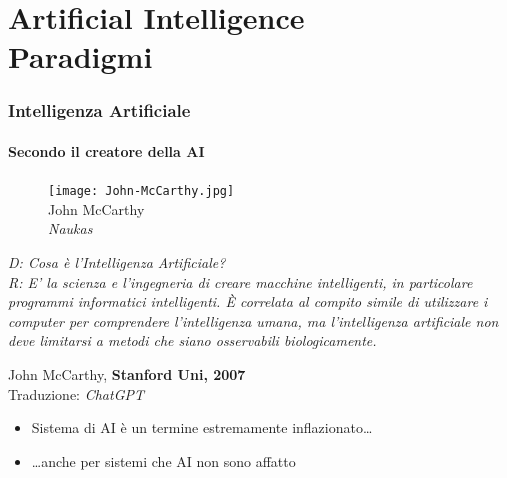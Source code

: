 \section{Artificial Intelligence\\{\small Paradigmi}} %
\label{sec:ai_paradigms}
%
\begin{frame}[t,fragile] \frametitle{Intelligenza Artificiale}
{\scriptsize
	\onslide<1->
		\framesubtitle{Secondo il creatore della AI}
		\vspace*{3pt}
		\begin{minipage}[t]{\textwidth}
			\begin{minipage}[t]{0.45\textwidth}
				\centering
				\begin{figure}[ht]
					\texttt{[image: John-McCarthy.jpg]}
					{\tiny\\John McCarthy\\\vspace*{-1pt}\textit{\textcopyright Naukas}}
				\end{figure}
			\end{minipage}
		    \begin{minipage}[t]{0.5\textwidth}
				\renewcommand{\epigraphsize}{\small}
				\setlength{\afterepigraphskip}{0pt}
				\setlength{\beforeepigraphskip}{5pt}
				\setlength{\epigraphwidth}{\textwidth}
				\epigraph{
					\textit{\alert{D:} Cosa è l'Intelligenza Artificiale?\\
					\alert{R:} E' la scienza e l'ingegneria di creare macchine intelligenti, in particolare programmi informatici intelligenti. È correlata al compito simile di utilizzare i computer per comprendere l'intelligenza umana, ma l'intelligenza artificiale non deve limitarsi a metodi che siano osservabili biologicamente.}}{John McCarthy, \textbf{Stanford Uni, 2007}\\Traduzione: \textit{\textcopyright ChatGPT}}
			\end{minipage}
		\end{minipage}
}
	\begin{itemize}[leftmargin=10pt,align=right]
		\item[\alert{\faHandORight}] Sistema di AI è un termine estremamente inflazionato\ldots 
		\onslide<3->\item[\alert{\faHandORight}] \ldots anche per sistemi che AI non sono affatto
	\end{itemize}
\end{frame}
%
